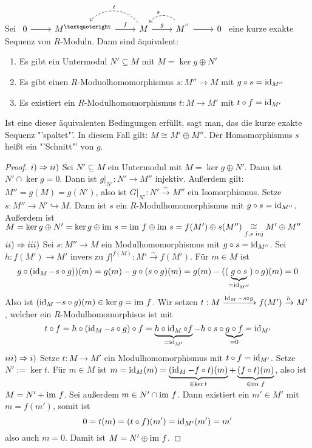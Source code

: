\begin{sa}
	Sei $\begin{tikzcd}
	0  \arrow{r} & M^{’} \arrow{r}{f} & M \arrow{r}{g}\arrow[bend right = 50,swap, dashed]{l}{t} & M^{''}\arrow[bend right = 50,swap, dashed]{l}{s} \arrow{r} & 0
	\end{tikzcd}$ eine kurze exakte Sequenz von $R$-Moduln. Dann sind äquivalent:
	\begin{enumerate}[label= \roman*)]
		\item Es gibt ein Untermodul $N'\subseteq M$ mit $M= \ker g \oplus N'$
		\item Es gibt einen $R$-Moduolhomomorphismus $s:M''\to M$ mit $g \circ s = \operatorname{\text{id}}_{M''}$
		\item Es existiert ein $R$-Modulhomomorphismus $t:M \to M'$ mit $t\circ f = \operatorname{\text{id}}_{M'}$
	\end{enumerate}
	Ist eine dieser äquivalenten Bedingungen erfüllt, sagt man, das die kurze exakte Sequenz "'spaltet"'. In diesem Fall gilt: $M \cong M' \oplus M''$. Der Homomorphismus $s$ heißt ein "'Schnitt"' von $g$.
\end{sa}
\begin{proof}
	$i) \Rightarrow ii)$ Sei $N'\subseteq M$ ein Untermodul mit $M= \ker g \oplus N'$. Dann ist $N'\cap \ker g = 0$. Dann ist $g\big|_{N'} : N' \to M''$ injektiv. Außerdem gilt: $M''= g(M) = g(N')$, also ist $G\big|_{N'} : N' \overset{\sim}{\longrightarrow} M''$ ein Isomorphismus. Setze $s:M'' \to N' \hookrightarrow M$. Dann ist $s$ ein $R$-Modulhomomorphismus mit $g\circ s = \operatorname{\text{id}}_{M''}$. Außerdem ist $M= \ker g \oplus N' = \ker g \oplus \operatorname{\text{im}\,} s = \operatorname{\text{im}\,} f \oplus \operatorname{\text{im}\,} s = f(M') \oplus s(M'') \underset{f,s\text{ inj}}{\cong} M' \oplus M''$\\
	$ii) \Rightarrow iii)$ Sei $s:M'' \to M$ ein Modulhomomorphismus mit $g\circ s= \operatorname{\text{id}}_{M''}$. Sei $h:f(M') \to M'$ invers zu $f\big|^{f(M)}: M' \overset{\sim}{\longrightarrow} f(M')$. Für $m\in M$ ist 
	$$g\circ (\operatorname{\text{id}}_M - s\circ g))(m) = g(m) - g\circ (s\circ g)(m) = g(m) - ((\underbrace{g\circ s}_{=\operatorname{\text{id}}_{M''}}) \circ g)(m) = 0$$
	Also ist $(\operatorname{\text{id}}_{M} - s\circ g)(m) \in \ker g = \operatorname{\text{im}\,} f$. Wir setzen $t:M \xrightarrow{\operatorname{\text{id}}_M - s\circ g} f(M') \xrightarrow{h} M'$, welcher ein $R$-Modulhomomorphisus ist mit 
	$$t\circ f = h\circ (\operatorname{\text{id}}_M - s\circ g)\circ f = \underbrace{h\circ \operatorname{\text{id}}_M \circ f}_{=\operatorname{\text{id}}_{M'}} - h\circ s \circ \underbrace{g\circ f}_{=0} = \operatorname{\text{id}}_{M'}$$
	$iii)\Rightarrow i)$ Setze $t:M\to M'$ ein Modulhomomorphismus mit $t\circ f = \operatorname{\text{id}}_{M'}$. Setze $N':= \ker t$. Für $m\in M$ ist $m=\operatorname{\text{id}}_M(m) = \underbrace{(\operatorname{\text{id}}_M- f\circ t)(m)}_{\in \ker t} + \underbrace{(f\circ t)(m)}_{\in \operatorname{\text{im}\,} f}$, also ist $M= N' + \operatorname{\text{im}\,} f$. Sei außerdem $m\in N' \cap \operatorname{\text{im}\,} f$. Dann existiert ein $m'\in M'$ mit $m= f(m')$, somit ist
	$$0 =t(m) = (t\circ f)(m') = \operatorname{\text{id}}_{M'}(m') = m'$$
	also auch $m=0$. Damit ist $M= N' \oplus \operatorname{\text{im}\,} f$.
\end{proof}
